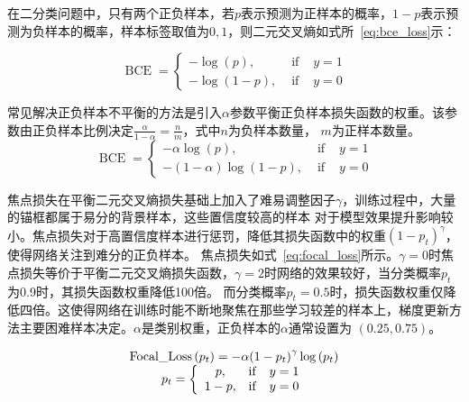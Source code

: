在二分类问题中，只有两个正负样本，若$p$表示预测为正样本的概率，$1-p$表示预测为负样本的概率，样本标签取值为$0,1$，则二元交叉熵如式所~\ref{eq:bce_loss}示：

\begin{equation}         
  \operatorname{BCE}=\left\{\begin{array}{ccc} -\log (p), & \text { if } & y=1 \\ -\log (1-p), & \text { if } & y=0 \end{array}\right.  
  \label{eq:bce_loss}   
\end{equation} 

常见解决正负样本不平衡的方法是引入$\alpha$参数平衡正负样本损失函数的权重。该参数由正负样本比例决定$\frac{\alpha}{1-\alpha} = \frac{n}{m}$，式中$n$为负样本数量，
$m$为正样本数量。
\begin{equation}            
  \operatorname{BCE}=\left\{\begin{array}{ccc} -\alpha \log (p), & \text { if } & y=1 \\ -(1-\alpha) \log (1-p), & \text { if } & y=0 \end{array}\right.    
  \label{eq:bce_loss_alpha}    
\end{equation} 

焦点损失在平衡二元交叉熵损失基础上加入了难易调整因子$\gamma$，训练过程中，大量的锚框都属于易分的背景样本，这些置信度较高的样本
对于模型效果提升影响较小。焦点损失对于高置信度样本进行惩罚，降低其损失函数中的权重$(1-p_t)^{\gamma}$，使得网络关注到难分的正负样本。
焦点损失如式~\ref{eq:focal_loss}所示。$\gamma=0$时焦点损失等价于平衡二元交叉熵损失函数，$\gamma=2$时网络的效果较好，当分类概率$p_t$为0.9时，其损失函数权重降低100倍。
而分类概率$p_t = 0.5$时，损失函数权重仅降低四倍。这使得网络在训练时能不断地聚焦在那些学习较差的样本上，梯度更新方法主要困难样本决定。$\alpha$是类别权重，正负样本的$\alpha$通常设置为
$(0.25, 0.75)$。

\begin{equation}               
  \begin{array}{*{20}{c}} {{\rm{Focal\_Loss}}\left( {{p_t}} \right) =  - \alpha {{\left( {1 - {p_t}} \right)}^\gamma }\log \left( {{p_t}} \right)}\\ {{p_t} = \left\{ {\begin{array}{*{20}{c}} {p,}&{{\rm{ if }}}&{y = 1}\\ {1 - p,}&{{\rm{ if }}}&{y = 0} \end{array}} \right.} \end{array}    
  \label{eq:focal_loss}     
\end{equation} 

